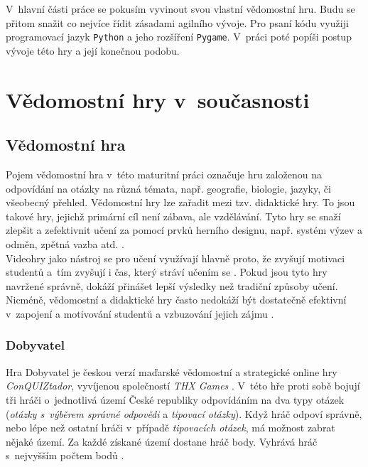 \documentclass[12pt]{report}
\begin{document}
	V~hlavní části práce se pokusím vyvinout svou vlastní vědomostní hru. Budu se přitom snažit co nejvíce řídit zásadami agilního vývoje. Pro psaní kódu využiji programovací jazyk \texttt{Python} a jeho rozšíření \texttt{Pygame}. V~práci poté popíši postup vývoje této hry a její konečnou podobu.
	
	
\part{Vědomostní hry v~současnosti}  %
	
\chapter{Vědomostní hra}
Pojem vědomostní hra v~této maturitní práci označuje hru založenou na odpovídání na otázky na různá témata, např. geografie, biologie, jazyky, či všeobecný přehled. Vědomostní hry lze zařadit mezi tzv. didaktické hry. To jsou takové hry, jejichž primární cíl není zábava, ale vzdělávání. Tyto hry se snaží zlepšit a zefektivnit učení za pomocí prvků herního designu, např. systém výzev a odměn, zpětná vazba atd. \cite{Arnold2016}.\\

Videohry jako nástroj se pro učení využívají hlavně proto, že zvyšují motivaci studentů a~tím zvyšují i čas, který stráví učením se \cite{Dondlinger2007}.	Pokud jsou tyto hry navržené správně, dokáží přinášet lepší výsledky než tradiční způsoby učení. Nicméně, vědomostní a didaktické hry často nedokáží být dostatečně efektivní v~zapojení a motivování studentů a vzbuzování jejich zájmu \cite{Arnold2016}.
	
\section{Dobyvatel}
Hra Dobyvatel je českou verzí maďarské vědomostní a strategické online hry \textit{ConQUIZtador}, vyvíjenou společností \textit{THX Games} \cite{Macich2010}. V~této hře proti sobě bojují tři hráči o~jednotlivá území České republiky odpovídáním na dva typy otázek (\textit{otázky s~výběrem správné odpovědi} a \textit{tipovací otázky}). Když hráč odpoví správně, nebo lépe než ostatní hráči v~případě \textit{tipovacích otázek}, má možnost zabrat nějaké území. Za každé získané území dostane hráč body. Vyhrává hráč s~nejvyšším počtem bodů \cite{Dobyvatel2017}.\\
\end{document}
